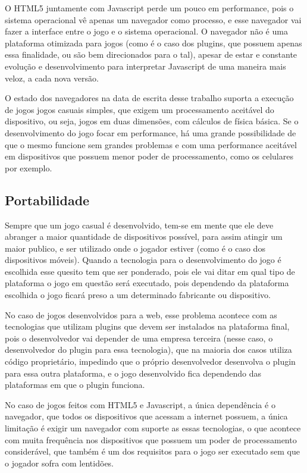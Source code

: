 O HTML5 juntamente com Javascript perde um pouco em performance, pois
o sistema operacional vê apenas um navegador como processo, e esse
navegador vai fazer a interface entre o jogo e o sistema operacional.
O navegador não é uma plataforma otimizada para jogos (como é o caso
dos plugins, que possuem apenas essa finalidade, ou são bem
direcionados para o tal), apesar de estar e constante evolução e
desenvolvimento para interpretar Javascript de uma maneira mais veloz,
a cada nova versão.

O estado dos navegadores na data de escrita desse
trabalho suporta a execução de jogos jogos casuais simples, que exigem
um processamento aceitável do dispositivo, ou seja, jogos em duas
dimensões, com cálculos de física básica. Se o desenvolvimento do jogo
focar em performance, há uma grande possibilidade de que o mesmo
funcione sem grandes problemas e com uma performance aceitável em dispositivos
que possuem menor poder de processamento, como os celulares por exemplo.

\subsection{Portabilidade}

Sempre que um jogo casual é desenvolvido, tem-se em mente que ele deve
abranger a maior quantidade de dispositivos possível, para assim
atingir um maior publico, e ser utilizado onde o jogador estiver (como
é o caso dos dispositivos móveis). Quando a tecnologia para o
desenvolvimento do jogo é escolhida esse quesito tem que ser
ponderado, pois ele vai ditar em qual tipo de plataforma o jogo em
questão será executado, pois dependendo da plataforma escolhida o jogo ficará preso
a um determinado fabricante ou dispositivo.

No caso de jogos desenvolvidos para a web, esse problema acontece com as
tecnologias que utilizam plugins que devem ser instalados na
plataforma final, pois o desenvolvedor vai depender de uma empresa
terceira (nesse caso, o desenvolvedor do plugin para essa tecnologia),
que na maioria dos casos utiliza código proprietário, impedindo que o
próprio desenvolvedor desenvolva o plugin para essa outra plataforma,
e o jogo desenvolvido fica dependendo das plataformas em que o plugin
funciona.

No caso de jogos feitos com HTML5 e Javascript, a única dependência é
o navegador, que todos os dispositivos que acessam a internet possuem,
a única limitação é exigir um navegador com suporte as essas
tecnologias, o que acontece com muita frequência nos dispositivos que
possuem um poder de processamento considerável, que também é um dos
requisitos para o jogo ser executado sem que o jogador sofra com
lentidões.

